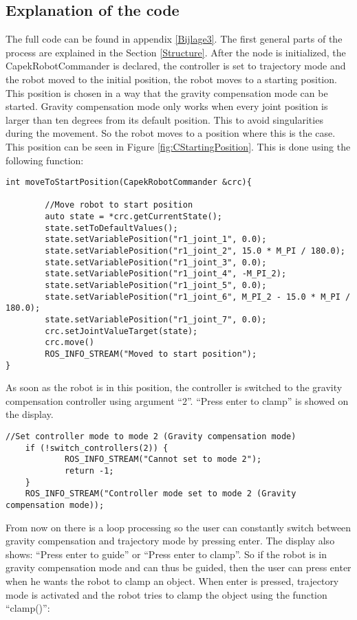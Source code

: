 \documentclass[11pt,a4paper]{report}
\begin{document}
\subsection{Explanation of the code}
The full code can be found in appendix \ref{Bijlage3}.
The first general parts of the process are explained in the Section \ref{Structure}.
After the node is initialized, the CapekRobotCommander is declared, the controller is set to trajectory mode and the robot moved to the initial position, the robot moves to a starting position. This position is chosen in a way that the gravity compensation mode can be started. Gravity compensation mode only works when every joint position is larger than ten degrees from its default position. This to avoid singularities during the movement. So the robot moves to a position where this is the case. This position can be seen in Figure \ref{fig:CStartingPosition}. This is done using the following function:
\begin{verbatim}
int moveToStartPosition(CapekRobotCommander &crc){

	    //Move robot to start position
	    auto state = *crc.getCurrentState();
	    state.setToDefaultValues();
	    state.setVariablePosition("r1_joint_1", 0.0);
	    state.setVariablePosition("r1_joint_2", 15.0 * M_PI / 180.0);
	    state.setVariablePosition("r1_joint_3", 0.0);
	    state.setVariablePosition("r1_joint_4", -M_PI_2);
	    state.setVariablePosition("r1_joint_5", 0.0);
	    state.setVariablePosition("r1_joint_6", M_PI_2 - 15.0 * M_PI / 180.0);
	    state.setVariablePosition("r1_joint_7", 0.0);
	    crc.setJointValueTarget(state);
	    crc.move()
	    ROS_INFO_STREAM("Moved to start position");
}
\end{verbatim}
As soon as the robot is in this position, the controller is switched to the gravity compensation controller using argument ``2''. ``Press enter to clamp'' is showed on the display.
\begin{verbatim}
//Set controller mode to mode 2 (Gravity compensation mode)
	if (!switch_controllers(2)) {
		    ROS_INFO_STREAM("Cannot set to mode 2");
		    return -1;
	}
	ROS_INFO_STREAM("Controller mode set to mode 2 (Gravity compensation mode));
\end{verbatim}
From now on there is a loop processing so the user can constantly switch between gravity compensation and trajectory mode by pressing enter. The display also shows: ``Press enter to guide'' or ``Press enter to clamp''. So if the robot is in gravity compensation mode and can thus be guided, then the user can press enter when he wants the robot to clamp an object. When enter is pressed, trajectory mode is activated and the robot tries to clamp the object using the function ``clamp()'':
\end{document}
